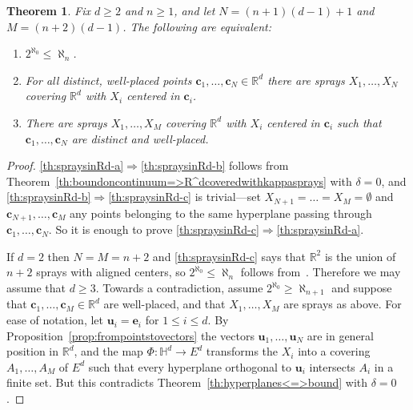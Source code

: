 \documentclass[12pt]{amsart}
\newcommand{\R}{\mathbb{R}}	%
\newcommand{\IMPLIES}{\Rightarrow }
\theoremstyle{plain}
\newtheorem{theorem}{Theorem}[section]
\theoremstyle{definition}
\theoremstyle{remark}
\begin{document}
\begin{theorem}\label{th:spraysinRd}
Fix \( d \geq 2 \) and \( n \geq 1 \), and let \( N = ( n + 1 ) ( d - 1) + 1 \) and \( M = ( n + 2 ) ( d - 1 ) \).
The following are equivalent:
\begin{enumerate}[label={\upshape (\alph*)}]
\item\label{th:spraysinRd-a}
\( 2^{\aleph_0 } \leq \aleph_n \).
\item\label{th:spraysinRd-b}
For all distinct, well-placed points \( \mathbf{c}_1 , \dots , \mathbf{c}_N \in \R^d \) there are sprays \( X_1 , \dots , X_N \) covering \( \R^d \) with \( X_i \) centered in \( \mathbf{c}_i \).
\item\label{th:spraysinRd-c}
There are sprays \( X_1 , \dots , X_M \) covering \( \R^d \) with \( X_i \) centered in \( \mathbf{c}_i \) such that \( \mathbf{c}_1 , \dots , \mathbf{c}_N \) are distinct and well-placed.
\end{enumerate}
\end{theorem}

\begin{proof}
\ref{th:spraysinRd-a}\( \IMPLIES \)\ref{th:spraysinRd-b} follows from Theorem~\ref{th:boundoncontinuum=>R^dcoveredwithkappasprays} with \( \delta = 0 \), and \ref{th:spraysinRd-b}\( \IMPLIES \)\ref{th:spraysinRd-c} is trivial---set \( X_{N + 1} = \dots = X_M = \emptyset \) and \( \mathbf{c}_{ N + 1 } , \dots , \mathbf{c}_ M \) any points belonging to the same hyperplane passing through \( \mathbf{c}_1 , \dots , \mathbf{c}_N \).
So it is enough to prove \ref{th:spraysinRd-c}\( \IMPLIES \)\ref{th:spraysinRd-a}.

If \( d = 2 \) then \( N = M = n + 2 \) and \ref{th:spraysinRd-c} says that \( \R^2 \) is the union of \( n + 2 \) sprays with aligned centers, so \( 2^{\aleph_0 } \leq \aleph_n \) follows from~\cite[Theorem 7]{Schmerl:2010nr}.
Therefore we may assume that \( d \geq 3 \).
Towards a contradiction, assume \( 2^{\aleph_0 } \geq \aleph_{ n + 1} \) and suppose that \( \mathbf{c}_1 , \dots , \mathbf{c}_M \in \R^d \) are well-placed, and that \( X_1 , \dots , X_M \) are sprays as above.
For ease of notation, let \( \mathbf{u}_i = \mathbf{e}_i \) for \( 1 \leq i \leq d \).
By Proposition~\ref{prop:frompointstovectors} the vectors \( \mathbf{u}_1 , \dots , \mathbf{u}_N \) are in general position in \( \R^d \), and the map \( \Phi \colon \mathbb{H}^d \to E^d \) transforms the \( X_i \) into a covering \( A_1 ,\dots , A_M \) of \( E^d \) such that every hyperplane orthogonal to \( \mathbf{u}_i \) intersects \( A_i \) in a finite set.
But this contradicts Theorem~\ref{th:hyperplanes<=>bound} with \( \delta = 0 \).
\end{proof}
\end{document}
